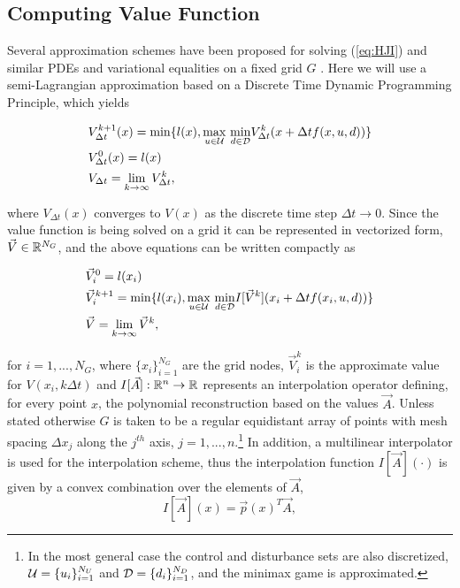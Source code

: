 \subsection{Computing Value Function}
Several approximation schemes have been proposed for solving (\ref{eq:HJI}) and similar PDEs and variational equalities on a fixed grid $G$ \cite{Bardi1999, Falcone1994, Mitchell2005, Osher2003, Sethian1996}. Here we will use a semi-Lagrangian approximation based on a Discrete Time Dynamic Programming Principle, which yields

\begin{subequations}
\begin{align}
&V_{\Delta t}^{k+1}(x) = \min\{l(x),  \underset{u\in\mathcal{U}}{\max}\text{ }\underset{ d\in\mathcal{D}}{\min} V^{k}_{\Delta t}(x+\Delta t f(x,u,d))\}\\
&V_{\Delta t}^{0}(x) = l(x)\\
&V_{\Delta t} = \lim_{k\rightarrow \infty} V^{k}_{\Delta t},
\end{align}
\end{subequations}

\noindent where $V_{\Delta t}(x)$ converges to $V(x)$ as the discrete time step $\Delta t \rightarrow 0$. Since the value function is being solved on a grid it can be represented in vectorized form, $\vec{V} \in \mathbb{R}^{N_G}$, and the above equations can be written compactly as

\begin{subequations} \label{eq:dp_min_dist}
\begin{align}
&\vec{V}_{i}^{0} = l(x_i)\\
&\vec{V}_{i}^{k+1} = \min\{l(x_i),  \underset{u\in\mathcal{U}}{\max}\text{ }\underset{ d\in\mathcal{D}}{\min} I[\vec{V}^{k}](x_i+\Delta t f(x_i,u,d)) \label{eq:dp_min_dist_b}\}\\
&\vec{V} = \lim_{k\rightarrow \infty} \vec{V}^{k},
\end{align}
\end{subequations}

\noindent for  $i=1, ..., N_G$, where $\{x_i\}_{i=1}^{N_G}$ are the grid nodes, $\vec{V}_i^k$ is the approximate value for $V(x_i, k \Delta t)$ and $I[\vec{A}]:\mathbb{R}^n \rightarrow \mathbb{R}$ represents an interpolation operator defining, for every point $x$, the polynomial reconstruction based on the values $\vec{A}$. Unless stated otherwise $G$ is taken to be a regular equidistant array of points with mesh spacing $\Delta x_j$ along the $j^{th}$ axis, $j=1,...,n$.\footnote{In the most general case the control and disturbance sets are also discretized, $\mathcal{U}=\{u_i\}_{i=1}^{N_U}$ and $\mathcal{D}=\{d_i\}_{i=1}^{N_D}$, and the minimax game is approximated.} In addition, a multilinear interpolator is used for the interpolation scheme, thus the interpolation function $I[\vec{A}](\cdot)$ is given by a convex combination over the elements of $\vec{A}$,
\begin{equation}
I[\vec{A}](x)= \vec{p}(x)^T \vec{A},
\end{equation}

